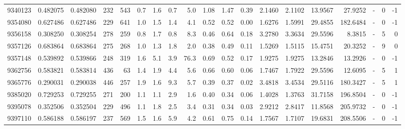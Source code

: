 \begin{tabular}{rrrrrrrrrrrrrrrrlrr}
   9340123 & 0.482075 &   0.482080 &  232 &  543 &      0.7 &      1.6 &     0.7 &      5.0 &       1.08 &        1.47 &        0.39 &  2.1460 &  2.1102 &   13.9567 &   27.9252 &             - &        0 &         -1 \\
   9354080 & 0.627486 &   0.627486 &  229 &  641 &      1.0 &      1.5 &     1.4 &      4.1 &       0.52 &        0.52 &        0.00 &  1.6276 &  1.5991 &   29.4855 &  182.6484 &             - &        0 &         -1 \\
   9356158 & 0.308250 &   0.308254 &  278 &  259 &      0.8 &      1.7 &     0.8 &      8.3 &       0.46 &        0.64 &        0.18 &  3.2780 &  3.3634 &   29.5596 &    8.3815 &             - &        5 &          0 \\
   9357126 & 0.683864 &   0.683864 &  275 &  268 &      1.0 &      1.3 &     1.8 &      2.0 &       0.38 &        0.49 &        0.11 &  1.5269 &  1.5115 &   15.4751 &   20.3252 &             - &        9 &          0 \\
   9357148 & 0.539892 &   0.539866 &  248 &  319 &      1.6 &      5.1 &     3.9 &     76.3 &       0.69 &        0.52 &        0.17 &  1.9275 &  1.9275 &   13.2846 &   13.2926 &             - &        0 &         -1 \\
   9362756 & 0.583821 &   0.583814 &  436 &   63 &      1.4 &      1.9 &     4.4 &      5.6 &       0.66 &        0.60 &        0.06 &  1.7467 &  1.7922 &   29.5596 &   12.6095 &             - &        5 &          1 \\
   9365776 & 0.290031 &   0.290038 &  446 &  257 &      1.9 &      1.6 &     9.3 &      5.7 &       0.39 &        0.37 &        0.02 &  3.4818 &  3.4534 &   29.5116 &  180.3427 &             - &        5 &          1 \\
   9385020 & 0.729253 &   0.729255 &  271 &  200 &      1.1 &      1.1 &     2.9 &      1.6 &       0.40 &        0.34 &        0.06 &  1.4028 &  1.3763 &   31.7158 &  196.8504 &             - &        0 &         -1 \\
   9395078 & 0.352506 &   0.352504 &  229 &  496 &      1.1 &      1.8 &     2.5 &      3.4 &       0.31 &        0.34 &        0.03 &  2.9212 &  2.8417 &   11.8568 &  205.9732 &             - &        0 &         -1 \\
   9397110 & 0.586188 &   0.586197 &  237 &  569 &      1.5 &      1.6 &     5.9 &      4.2 &       0.61 &        0.75 &        0.14 &  1.7567 &  1.7107 &   19.6831 &  208.5506 &             - &        0 &         -1 \\

\end{tabular}

